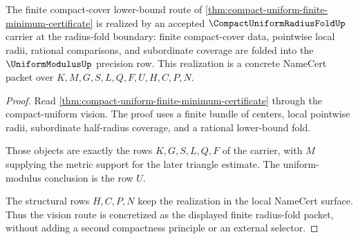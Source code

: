 \begin{theorem}
\label{thm:compact-uniform-radius-fold-vision-realization}
The finite compact-cover lower-bound route of \autoref{thm:compact-uniform-finite-minimum-certificate} is realized by an accepted $\CompactUniformRadiusFoldUp$ carrier at the radius-fold boundary: finite compact-cover data, pointwise local radii, rational comparisons, and subordinate coverage are folded into the $\UniformModulusUp$ precision row. This realization is a concrete NameCert packet over $K,M,G,S,L,Q,F,U,H,C,P,N$.
\end{theorem}
\begin{proof}
Read \autoref{thm:compact-uniform-finite-minimum-certificate} through the compact-uniform vision. The proof uses a finite bundle of centers, local pointwise radii, subordinate half-radius coverage, and a rational lower-bound fold.

Those objects are exactly the rows $K,G,S,L,Q,F$ of the carrier, with $M$ supplying the metric support for the later triangle estimate. The uniform-modulus conclusion is the row $U$.

The structural rows $H,C,P,N$ keep the realization in the local NameCert surface. Thus the vision route is concretized as the displayed finite radius-fold packet, without adding a second compactness principle or an external selector.
\end{proof}





